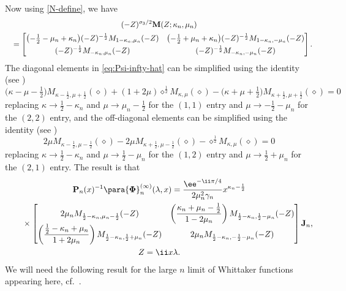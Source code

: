 Now using \eqref{N-define}, we have
\begin{gather*}
 (-Z)^{\sigma_3/2}\mathbf{M}(Z;\kappa_n,\mu_n) \\
 \quad=
 \begin{bmatrix}
 \bigl(-\frac{1}{2} - \mu_n+\kappa_n\bigr)(-Z)^{-\frac{1}{2}}M_{1-\kappa_n,\mu_n}(-Z) & \bigl(-\frac{1}{2}+\mu_n+\kappa_n\bigr)(-Z)^{-\frac{1}{2}}M_{1-\kappa_n,-\mu_n}(-Z)\vspace{1mm}\\
 (-Z)^{-\frac{1}{2}}M_{-\kappa_n,\mu_n}(-Z) & (-Z)^{-\frac{1}{2}}M_{-\kappa_n,-\mu_n}(-Z)
 \end{bmatrix}.
\end{gather*}
The diagonal elements in \eqref{eq:Psi-infty-hat} can be simplified using the identity (see \cite[equation~(13.15.3)]{DLMF})
\begin{equation*}
 \big(\kappa-\mu-\tfrac{1}{2}\big)M_{\kappa-\frac{1}{2},\mu+\frac{1}{2}}(\diamond)+(1+2\mu)\diamond^{\frac{1}{2}}M_{\kappa,\mu}(\diamond) -\big(\kappa+\mu+\tfrac{1}{2}\big)M_{\kappa+\frac{1}{2},\mu+\frac{1}{2}}(\diamond)=0
\end{equation*}
replacing $\kappa\to\frac{1}{2}-\kappa_n$ and $\mu\to\mu_n-\frac{1}{2}$ for the $(1,1)$ entry and $\mu\to-\frac{1}{2}-\mu_n$ for the $(2,2)$ entry,
and the off-diagonal elements can be simplified using the identity (see \cite[equation~(13.15.4)]{DLMF})
\begin{equation*}
 2\mu M_{\kappa-\frac{1}{2},\mu-\frac{1}{2}}(\diamond)-2\mu M_{\kappa+\frac{1}{2},\mu-\frac{1}{2}}(\diamond)-\diamond^{\frac{1}{2}}M_{\kappa,\mu}(\diamond)=0
\end{equation*}
replacing $\kappa \to \frac{1}{2}-\kappa_n$ and $\mu\to\frac{1}{2}-\mu_n$ for the $(1,2)$ entry and $\mu\to\frac{1}{2}+\mu_n$ for the $(2,1)$ entry. The result is that
\begin{gather}
 \mathbf{P}_n(x)^{-1}\para{\mathbf{\Phi}}_n^{(\infty)}(\lambda,x)
 =\frac{\ee^{-\ii\pi/4}}{2 \mu_n^2 \gamma_n}x^{\kappa_n-\frac{1}{2}}\nonumber\\
 \qquad {}\times\begin{bmatrix}2\mu_n M_{\frac{1}{2}-\kappa_n,\mu_n-\frac{1}{2}}(-Z) & \left(\dfrac{\kappa_n + \mu_n - \frac{1}{2}}{1 - 2\mu_n}\right) M_{\frac{1}{2}-\kappa_n,\frac{1}{2}-\mu_n}(-Z) \\
 \left(\dfrac{\frac{1}{2} - \kappa_n + \mu_n}{1 + 2\mu_n}\right)M_{\frac{1}{2}-\kappa_n,\frac{1}{2}+\mu_n}(-Z) & 2\mu_n M_{\frac{1}{2}-\kappa_n,-\frac{1}{2}-\mu_n}(-Z)\end{bmatrix}\mathbf{J}_n,\nonumber\\ Z=\ii x\lambda.
 \label{eq:Psi-infty-hat-1}
\end{gather}
We will need the following result for the large $n$ limit of Whittaker functions appearing here, cf.~\cite[equation~(13.21.1)]{DLMF}.


